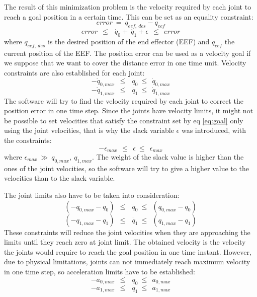 The result of this minimization problem is the velocity required by each joint to reach a goal position in a certain time. This can be set as an equality constraint:
\begin{equation}
error\ =\ q_{eef,\ des} - q_{eef}
\label{eq:init_error}
\end{equation}
\begin{equation}
error\ \ \leq\ \ \dot{\ q_{0}} + \dot{\ q_{1}} + \epsilon\ \ \leq\ \ error
\label{eq:goal}
\end{equation}
where $q_{eef,\ des}$ is the desired position of the end effector (EEF) and $q_{eef}$ the current position of the EEF. The position error can be used as a velocity goal if we suppose that we want to cover the distance error in one time unit. Velocity constraints are also established for each joint:
\begin{equation}
-\dot{q}_{0,max}\ \ \leq\ \ \dot{\ q_{0}}\ \leq\ \ \dot{q}_{0,max}
\end{equation}
\begin{equation}
-\dot{q}_{1,max}\ \ \leq\ \ \dot{\ q_{1}}\ \leq\ \ \dot{q}_{1,max}
\end{equation}
The software will try to find the velocity required by each joint to correct the position error in one time step. Since the joints have velocity limits, it might not be possible to set velocities that satisfy the constraint set by eq \ref{eq:goal} only using the joint velocities, that is why the slack variable $\epsilon$ was introduced, with the constraints: 
\begin{equation}
-\epsilon_{max}\ \ \leq\ \ \epsilon\ \leq\ \ \epsilon_{max}
\end{equation}
where $\epsilon_{max}\ \gg\ q_{0,max},\ q_{1,max}$. The weight of the slack value is higher than the ones of the joint velocities, so the software will try to give a higher value to the velocities than to the slack variable.

The joint limits also have to be taken into consideration:
\begin{equation}
(-q_{0,max} - q_{0})\ \ \leq\ \ \dot{\ q_{0}}\ \leq\ \ (q_{0,max} - q_{0})
\end{equation}
\begin{equation}
(-q_{1,max} - q_{1})\ \ \leq\ \ \dot{\ q_{1}}\ \leq\ \ (q_{1,max} - q_{1})
\end{equation}
These constraints will reduce the joint velocities when they are approaching the limits until they reach zero at joint limit. The obtained velocity is the velocity the joints would require to reach the goal position in one time instant. However, due to physical limitations, joints can not immediately reach maximum velocity in one time step, so acceleration limits have to be established:
\begin{equation}
-a_{0,max}\ \ \leq\ \ \dot{\ q_{0}}\ \leq\ \ a_{0,max}
\label{eq:accel0}
\end{equation}
\begin{equation}
-a_{1,max}\ \ \leq\ \ \dot{\ q_{1}}\ \leq\ \ a_{1,max}
\label{eq:accel1}
\end{equation}

